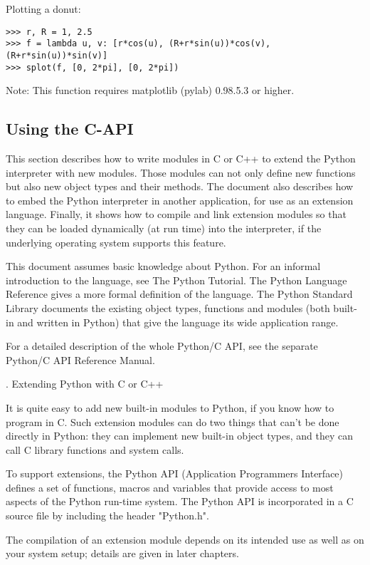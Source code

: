 Plotting a donut:

\begin{lstlisting}
>>> r, R = 1, 2.5
>>> f = lambda u, v: [r*cos(u), (R+r*sin(u))*cos(v), (R+r*sin(u))*sin(v)]
>>> splot(f, [0, 2*pi], [0, 2*pi])
\end{lstlisting}


Note: This function requires matplotlib (pylab) 0.98.5.3 or higher.


\subsection{Using the C-API}

This section describes how to write modules in C or C++ to extend the Python interpreter with new modules. Those modules can not only define new functions but also new object types and their methods. The document also describes how to embed the Python interpreter in another application, for use as an extension language. Finally, it shows how to compile and link extension modules so that they can be loaded dynamically (at run time) into the interpreter, if the underlying operating system supports this feature.

This document assumes basic knowledge about Python. For an informal introduction to the language, see The Python Tutorial. The Python Language Reference gives a more formal definition of the language. The Python Standard Library documents the existing object types, functions and modules (both built-in and written in Python) that give the language its wide application range.

For a detailed description of the whole Python/C API, see the separate Python/C API Reference Manual.

. Extending Python with C or C++

It is quite easy to add new built-in modules to Python, if you know how to program in C. Such extension modules can do two things that can’t be done directly in Python: they can implement new built-in object types, and they can call C library functions and system calls.

To support extensions, the Python API (Application Programmers Interface) defines a set of functions, macros and variables that provide access to most aspects of the Python run-time system. The Python API is incorporated in a C source file by including the header "Python.h".

The compilation of an extension module depends on its intended use as well as on your system setup; details are given in later chapters.

